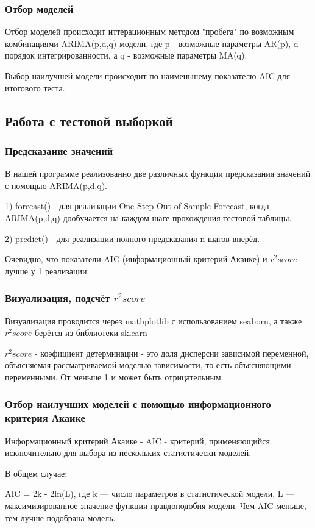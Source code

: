 \documentclass{article}
\begin{document}
    \subsubsection{Отбор моделей}
    Отбор моделей происходит иттерационным методом "пробега" по возможным комбинациями ARIMA(p,d,q) модели, где p - возможные параметры AR(p), d - порядок интегрированности, а q - возможные параметры MA(q).\par
    Выбор наилучшей модели происходит по наименьшему показателю AIC для итогового теста. 
    
  \subsection{Работа с тестовой выборкой}
  
    \subsubsection{Предсказание значений}
    В нашей программе реализованно две различных функции предсказания значений с помощью ARIMA(p,d,q).\par
    1) forecast() - для реализации One-Step Out-of-Sample Forecast, когда ARIMA(p,d,q) дообучается на каждом шаге прохождения тестовой таблицы. \par
    2) predict() - для реализации полного предсказания n шагов вперёд.\par
    Очевидно, что показатели AIC (информационный критерий Акаике) и $r^2 score$ лучше у 1 реализации.\par
    \subsubsection{Визуализация, подсчёт $r^2 score$}
    Визуализация проводится через mathplotlib с использованием seaborn, а также $r^2 score$ берётся из библиотеки sklearn \par
    $r^2 score$ - коэфициент детерминации - это доля дисперсии зависимой переменной, объясняемая рассматриваемой моделью зависимости, то есть объясняющими переменными. От меньше 1 и может быть отрицательным. 
   \subsubsection{Отбор наилучших моделей с помощью информационного критерия Акаике}
   Информационный критерий Акаике - AIC - критерий, применяющийся исключительно для выбора из нескольких статистически моделей.\par
   В общем случае: \par
  AIC = 2k - 2ln(L), где k — число параметров в статистической модели, L — максимизированное значение функции правдоподобия модели.
  Чем AIC меньше, тем лучше подобрана модель.
\newpage
  
\end{document}
